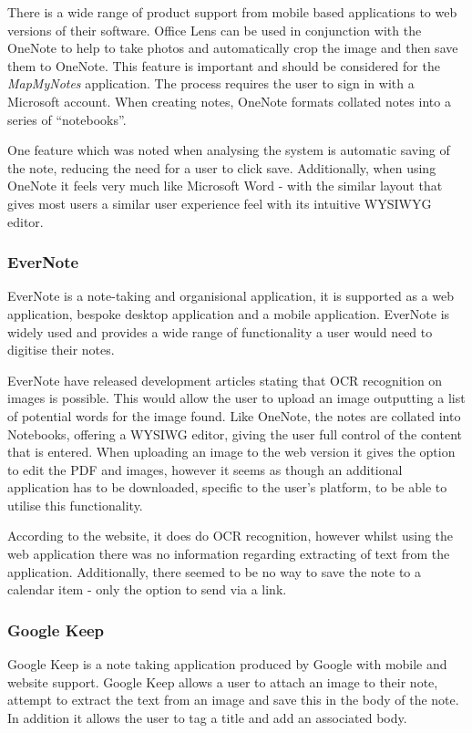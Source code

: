 There is a wide range of product support from mobile based applications to web versions of their software. Office Lens \cite{citeulike:14014272} can be used in conjunction with the OneNote to help to take photos and automatically crop the image and then save them to OneNote. This feature is important and should be considered for the \textit{MapMyNotes} application. The process requires the user to sign in with  a Microsoft account. When creating notes, OneNote formats collated notes into a series of ``notebooks''.

One feature which was noted when analysing the system is automatic saving of the note, reducing the need for a user to click save. Additionally, when using OneNote it feels very much like Microsoft Word - with the similar layout that gives most users a similar user experience feel with its intuitive WYSIWYG editor.

\subsubsection{EverNote}
EverNote \cite{citeulike:14014282} is a note-taking and organisional application, it is supported as a web application, bespoke desktop application and a mobile application. EverNote is widely used and provides a wide range of functionality a user would need to digitise their notes.

EverNote have released development articles \cite{citeulike:13988110} stating that OCR recognition on images is possible. This would allow the user to upload an image outputting a list of potential words for the image found. Like OneNote, the notes are collated into Notebooks, offering a WYSIWG editor, giving the user full control of the content that is entered. When uploading an image to the web version it gives the option to edit the PDF and images, however it seems as though an additional application has to be downloaded, specific to the user's platform, to be able to utilise this functionality.

According to the website, it does do OCR recognition, however whilst using the web application there was no information regarding extracting of text from the application. Additionally, there seemed to be no way to save the note to a calendar item - only the option to send via a link.

\subsubsection{Google Keep}
Google Keep \cite{citeulike:14014320} is a note taking application produced by Google with mobile and website support. Google Keep allows a user to attach an image to their note, attempt to extract the text from an image and save this in the body of the note. In addition it allows the user to tag a title and add an associated body.


